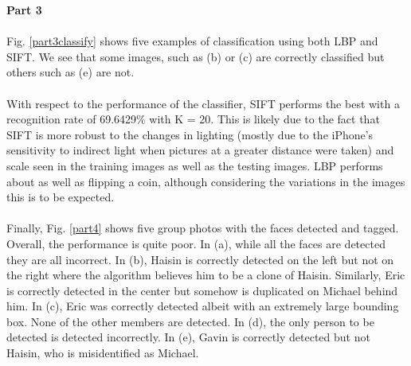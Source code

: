 \documentclass[10pt,letterpaper]{article}
\begin{document}
\vspace{5mm}
\textbf{Part 3}
\paragraph{}
Fig. \ref{part3classify} shows five examples of classification using both LBP and SIFT. We see that some images, such as (b) or (c) are correctly classified but others such as (e) are not.

\paragraph{}
With respect to the performance of the classifier, SIFT performs the best with a recognition rate of  69.6429\% with K = 20.  This is likely due to the fact that SIFT is more robust to the changes in lighting (mostly due to the iPhone's sensitivity to indirect light when pictures at a greater distance were taken) and scale seen in the training images as well as the testing images.  LBP performs about as well as flipping a coin, although considering the variations in the images this is to be expected.
\paragraph{}
Finally, Fig. \ref{part4} shows five group photos with the faces detected and tagged.  Overall, the performance is quite poor.  In (a), while all the faces are detected they are all incorrect.  In (b), Haisin is correctly detected on the left but not on the right where the algorithm believes him to be a clone of Haisin.  Similarly, Eric is correctly detected in the center but somehow is duplicated on Michael behind him.  In (c), Eric was correctly detected albeit with an extremely large bounding box. None of the other members are detected.  In (d), the only person to be detected is detected incorrectly. In (e), Gavin is correctly detected but not Haisin, who is misidentified as Michael.
\end{document}
